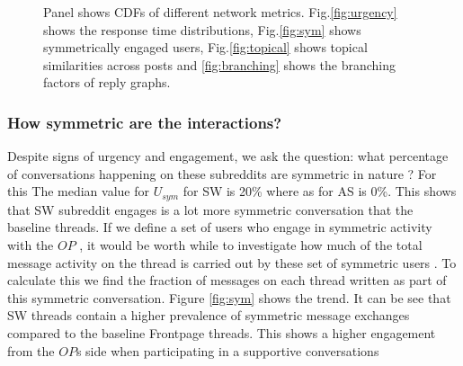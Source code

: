 \begin{figure}[!ht]
	\centering
    
    
    
    
\caption{Panel shows CDFs of different network metrics. Fig.\ref{fig:urgency} shows the response time distributions, Fig.\ref{fig:sym} shows symmetrically engaged users, Fig.\ref{fig:topical} shows topical similarities across posts and \ref{fig:branching} shows the branching factors of reply graphs. }
\end{figure}

\subsubsection{How symmetric are the interactions?}
Despite signs of urgency and engagement, we ask the question: what percentage of conversations happening on these subreddits are symmetric in nature ? 
For this The median value for $U_{sym}$ for SW is 20\% where as for AS is 0\%. This shows that SW subreddit engages is a lot more symmetric conversation that the baseline threads.
If we define a set of users who engage in symmetric activity with the $OP$ , it would be worth while to investigate how much of the total message activity on the thread is carried out by these set of symmetric users . To calculate this we find the fraction of messages on each thread written as part of this symmetric conversation. Figure \ref{fig:sym} shows the trend. It can be see that SW threads contain a higher prevalence of symmetric message exchanges compared to the baseline Frontpage threads. This shows a higher engagement from the $OP$s side when participating in a supportive conversations

